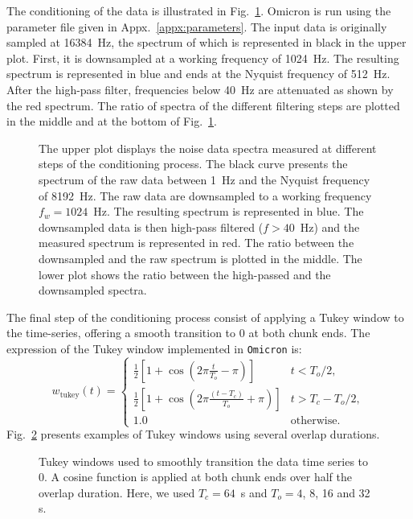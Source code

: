 The conditioning of the data is illustrated in Fig.~\ref{fig:conditioning}. Omicron is run using the parameter file given in Appx.~\ref{appx:parameters}. The input data is originally sampled at 16384~Hz, the spectrum of which is represented in black in the upper plot. First, it is downsampled at a working frequency of 1024~Hz. The resulting spectrum is represented in blue and ends at the Nyquist frequency of 512~Hz. After the high-pass filter, frequencies below 40~Hz are attenuated as shown by the red spectrum. The ratio of spectra of the different filtering steps are plotted in the middle and at the bottom of Fig.~\ref{fig:conditioning}.
\begin{figure}
  \center
  \caption{The upper plot displays the noise data spectra measured at different steps of the conditioning process. The black curve presents the spectrum of the raw data between 1~Hz and the Nyquist frequency of 8192~Hz. The raw data are downsampled to a working frequency $f_w=1024$~Hz. The resulting spectrum is represented in blue. The downsampled data is then high-pass filtered ($f>40$~Hz) and the measured spectrum is represented in red. The ratio between the downsampled and the raw spectrum is plotted in the middle. The lower plot shows the ratio between the high-passed and the downsampled spectra.}
  \label{fig:conditioning}
\end{figure}

The final step of the conditioning process consist of applying a Tukey window to the time-series, offering a smooth transition to 0 at both chunk ends. The expression of the Tukey window implemented in \texttt{Omicron} is:
\begin{equation}
  w_{\mathrm{tukey}}(t) = 
  \begin{cases}
     \frac{1}{2}\left[ 1+\cos{\left(2\pi\frac{t}{T_o}-\pi\right)}\right]& t < T_o/2, \\
     \frac{1}{2}\left[ 1+\cos{\left(2\pi\frac{(t-T_c)}{T_o}+\pi\right)}\right]& t > T_c-T_o/2, \\
     1.0 & \mathrm{otherwise}.
  \end{cases}
\end{equation}
Fig.~\ref{fig:tukey} presents examples of Tukey windows using several overlap durations.
\begin{figure}
  \center
  \caption{Tukey windows used to smoothly transition the data time series to 0. A cosine function is applied at both chunk ends over half the overlap duration. Here, we used $T_c=64$~s and $T_o = 4$, 8, 16 and 32 s.}
  \label{fig:tukey}
\end{figure}

